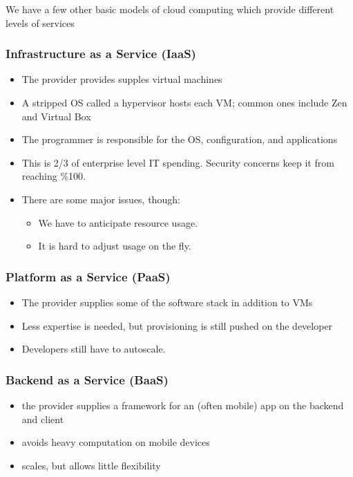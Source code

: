 \documentclass[../../lecture_notes.tex]{subfiles}
\begin{document}
We have a few other basic models of cloud computing which provide different levels of services


\subsubsection*{Infrastructure as a Service (IaaS)}
\begin{itemize}
	\item The provider provides supples virtual machines
	\item A stripped OS called a hypervisor hosts each VM; common ones include Zen and Virtual Box
	\item The programmer is responsible for the OS, configuration, and applications
	\item This is 2/3 of enterprise level IT spending. Security concerns keep it from reaching \%100.
	\item There are some major issues, though:
	\begin{itemize}
		\item We have to anticipate resource usage.
		\item It is hard to adjust usage on the fly.
	\end{itemize}
\end{itemize}


\subsubsection*{Platform as a Service (PaaS)}
\begin{itemize}
	\item The provider supplies some of the software stack in addition to VMs
	\item Less expertise is needed, but provisioning is still pushed on the developer
	\item Developers still have to autoscale.
\end{itemize}


\subsubsection*{Backend as a Service (BaaS)}
\begin{itemize}
	\item the provider supplies a framework for an (often mobile) app on the backend and client
	\item avoids heavy computation on mobile devices
	\item scales, but allows little flexibility
\end{itemize}
\end{document}

